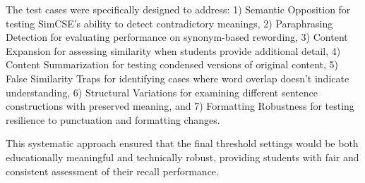 {{\color{maroon}The test cases were specifically designed to address: 1) Semantic Opposition for testing SimCSE's ability to detect contradictory meanings, 2) Paraphrasing Detection for evaluating performance on synonym-based rewording, 3) Content Expansion for assessing similarity when students provide additional detail, 4) Content Summarization for testing condensed versions of original content, 5) False Similarity Traps for identifying cases where word overlap doesn't indicate understanding, 6) Structural Variations for examining different sentence constructions with preserved meaning, and 7) Formatting Robustness for testing resilience to punctuation and formatting changes.}

This systematic approach ensured that the final threshold settings would be both educationally meaningful and technically robust, providing students with fair and consistent assessment of their recall performance.

\begin{figure}[!htbp]
\centering
\begin{minipage}{\textwidth}
\end{minipage}
\end{figure}}
